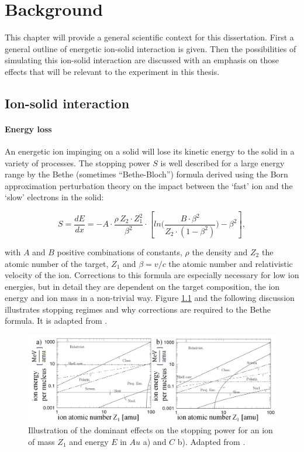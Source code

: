 \chapter{Background}

This chapter will provide a general scientific context for this dissertation. First a general outline of energetic ion-solid interaction is given. Then the possibilities of simulating this ion-solid interaction are discussed with an emphasis on those effects that will be relevant to the experiment in this thesis. 

\section{Ion-solid interaction}

\subsubsection{Energy loss}

An energetic ion impinging on a solid will lose its kinetic energy to the solid in a variety of processes. The stopping power $S$ is well described for a large energy range by the Bethe (sometimes ``Bethe-Bloch'') formula derived using the Born approximation perturbation theory on the impact between the `fast' ion and the `slow' electrons in the solid: 

\begin{equation}
S = \frac{dE}{dx} = - A \cdot \frac{\rho\,Z_2\cdot Z_1^2}{\beta^2} \cdot \left[ln\Big(\frac{B\cdot\beta^2}{Z_2\cdot(1-\beta^2)}\Big)-\beta^2\right] ,
\end{equation}


with $A$ and $B$ positive combinations of constants, $\rho$ the density and $Z_2$ the atomic number of the target, $Z_1$ and $\beta = v/c$ the atomic number and relativistic velocity of the ion. Corrections to this formula are especially necessary for low ion energies, but in detail they are dependent on the target composition, the ion energy and ion mass in a non-trivial way. Figure \ref{stopping} and the following discussion illustrates stopping regimes and why corrections are required to the Bethe formula. It is adapted from \cite{sigmund_stopping_2004}.

\begin{figure}
	\centering
		\includegraphics[width=.95\textwidth]{images/StoppinginAuandC.png}
	\caption{Illustration of the dominant effects on the stopping power for an ion of mass $Z_1$ and energy $E$ in $Au$ a) and $C$ b). Adapted from \cite{sigmund_stopping_2004}.} 
	\label{stopping}
\end{figure} 

